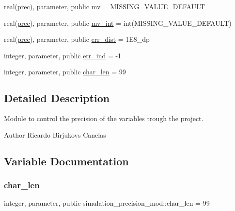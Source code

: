 \begin{DoxyCompactItemize}
\item 
real(\mbox{\hyperlink{namespacesimulation__precision__mod_aaff1ddf996761a1e11e787d63e1612f6}{prec}}), parameter, public \mbox{\hyperlink{namespacesimulation__precision__mod_a39845d8a0d331a7b9225feb5fe19ba3b}{mv}} = M\+I\+S\+S\+I\+N\+G\+\_\+\+V\+A\+L\+U\+E\+\_\+\+D\+E\+F\+A\+U\+LT
\item 
real(\mbox{\hyperlink{namespacesimulation__precision__mod_aaff1ddf996761a1e11e787d63e1612f6}{prec}}), parameter, public \mbox{\hyperlink{namespacesimulation__precision__mod_abcad51274c804cb573d8f5720c5dfa05}{mv\+\_\+int}} = int(M\+I\+S\+S\+I\+N\+G\+\_\+\+V\+A\+L\+U\+E\+\_\+\+D\+E\+F\+A\+U\+LT)
\item 
real(\mbox{\hyperlink{namespacesimulation__precision__mod_aaff1ddf996761a1e11e787d63e1612f6}{prec}}), parameter, public \mbox{\hyperlink{namespacesimulation__precision__mod_ae3222dd2d51f6b7221be1ca1c70e3e6c}{err\+\_\+dist}} = 1\+E8\+\_\+dp
\item 
integer, parameter, public \mbox{\hyperlink{namespacesimulation__precision__mod_a82a4b689dc26018c961193b991c489d4}{err\+\_\+ind}} = -\/1
\item 
integer, parameter, public \mbox{\hyperlink{namespacesimulation__precision__mod_a8a3305091ff953708508525398aa7129}{char\+\_\+len}} = 99
\end{DoxyCompactItemize}


\subsection{Detailed Description}
Module to control the precision of the variables trough the project. 

\begin{DoxyAuthor}{Author}
Ricardo Birjukovs Canelas 
\end{DoxyAuthor}


\subsection{Variable Documentation}
\mbox{\label{namespacesimulation__precision__mod_a8a3305091ff953708508525398aa7129}} 
\subsubsection{\texorpdfstring{char\+\_\+len}{char\_len}}
{\footnotesize\ttfamily integer, parameter, public simulation\+\_\+precision\+\_\+mod\+::char\+\_\+len = 99}



